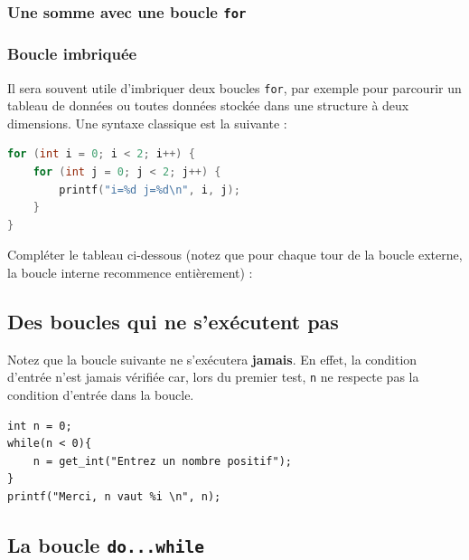 \subsubsection{Une somme avec une boucle \texttt{for}}
\TrouSommeFor

\subsubsection{Boucle imbriquée}
Il sera souvent utile d'imbriquer deux boucles \texttt{for},%
par exemple pour parcourir un tableau de données ou toutes données%
stockée dans une structure à deux dimensions. Une syntaxe classique%
est la suivante :

\begin{lstlisting}[language=c]
for (int i = 0; i < 2; i++) {
    for (int j = 0; j < 2; j++) {
        printf("i=%d j=%d\n", i, j);
    }
}
\end{lstlisting}

Compléter le tableau ci-dessous (notez que pour chaque tour de la boucle externe, la boucle interne recommence entièrement) :

\TableTraceCCinq



\subsection*{Des boucles qui ne s'exécutent pas}
Notez que la boucle suivante ne s'exécutera \textbf{jamais}. %
En effet, la condition d'entrée n'est jamais vérifiée car, lors du premier test,%
\texttt{n} ne respecte pas la condition d'entrée dans la boucle.
\begin{lstlisting}[caption={Boucle while qui ne s'exécutera jamais.}]
int n = 0;
while(n < 0){
    n = get_int("Entrez un nombre positif");
}
printf("Merci, n vaut %i \n", n);
\end{lstlisting}

\subsection{La boucle \texttt{do...while}}

